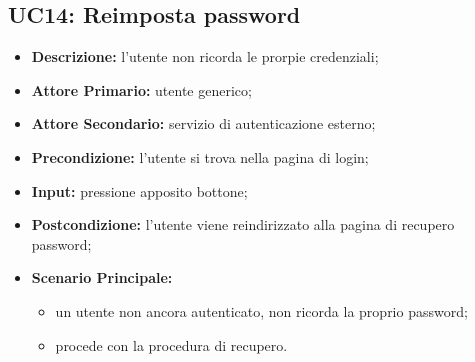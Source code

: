 \subsection{UC14: Reimposta password}
\label{sec:UC14}
\begin{itemize}
    \item \textbf{Descrizione:} l'utente non ricorda le prorpie credenziali;
    \item \textbf{Attore Primario:} utente generico;
    \item \textbf{Attore Secondario:} servizio di autenticazione esterno;
    \item \textbf{Precondizione:} l'utente si trova nella pagina di login;
    \item \textbf{Input:} pressione apposito bottone;
    \item \textbf{Postcondizione:} l'utente viene reindirizzato alla pagina di recupero password;
    \item \textbf{Scenario Principale:}
    \begin{itemize}
        \item un utente non ancora autenticato, non ricorda la proprio password;
        \item procede con la procedura di recupero.
    \end{itemize}
\end{itemize}